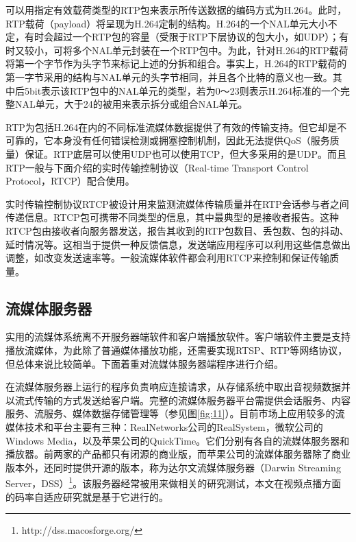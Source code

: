 可以用指定有效载荷类型的RTP包来表示所传送数据的编码方式为H.264。此时，RTP载荷（payload）将呈现为H.264定制的结构\supercite{RTP-H.264}。H.264的一个NAL单元大小不定，有时会超过一个RTP包的容量（受限于RTP下层协议的包大小，如UDP）；有时又较小，可将多个NAL单元封装在一个RTP包中。为此，针对H.264的RTP载荷将第一个字节作为头字节来标记上述的分拆和组合。事实上，H.264的RTP载荷的第一字节采用的结构与NAL单元的头字节相同，并且各个比特的意义也一致。其中后5bit表示该RTP包中的NAL单元的类型，若为0～23则表示H.264标准的一个完整NAL单元，大于24的被用来表示拆分或组合NAL单元。

RTP为包括H.264在内的不同标准流媒体数据提供了有效的传输支持。但它却是不可靠的，它本身没有任何错误检测或拥塞控制机制，因此无法提供QoS（服务质量）保证。RTP底层可以使用UDP也可以使用TCP，但大多采用的是UDP。而且RTP一般与下面介绍的实时传输控制协议（Real-time Transport Control Protocol，RTCP）配合使用。

实时传输控制协议RTCP被设计用来监测流媒体传输质量并在RTP会话参与者之间传递信息。RTCP包可携带不同类型的信息，其中最典型的是接收者报告。这种RTCP包由接收者向服务器发送，报告其收到的RTP包数目、丢包数、包的抖动、延时情况等。这相当于提供一种反馈信息，发送端应用程序可以利用这些信息做出调整，如改变发送速率等。一般流媒体软件都会利用RTCP来控制和保证传输质量。

\subsection{流媒体服务器}

实用的流媒体系统离不开服务器端软件和客户端播放软件。客户端软件主要是支持播放流媒体，为此除了普通媒体播放功能，还需要实现RTSP、RTP等网络协议，但总体来说比较简单。下面着重对流媒体服务器端程序进行介绍。

在流媒体服务器上运行的程序负责响应连接请求，从存储系统中取出音视频数据并以流式传输的方式发送给客户端。完整的流媒体服务器平台需提供会话服务、内容服务、流服务、媒体数据存储管理等（参见图\ref{fig:11}）。目前市场上应用较多的流媒体技术和平台主要有三种：RealNetworks公司的RealSystem，微软公司的Windows Media，以及苹果公司的QuickTime。它们分别有各自的流媒体服务器和播放器。前两家的产品都只有闭源的商业版，而苹果公司的流媒体服务器除了商业版本外，还同时提供开源的版本，称为达尔文流媒体服务器（Darwin Streaming Server，DSS）\footnote{http://dss.macosforge.org/}。该服务器经常被用来做相关的研究测试\supercite{Huang2004}，本文在视频点播方面的码率自适应研究就是基于它进行的。

